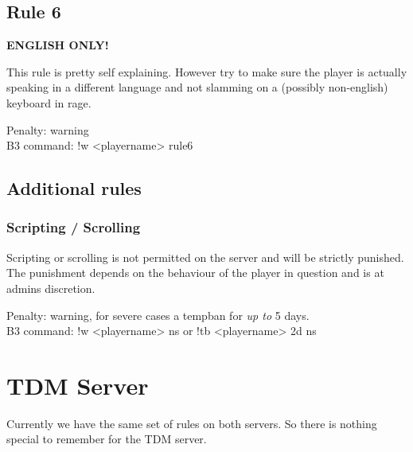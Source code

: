 \subsection*{Rule 6}
\label{rules:sd:6}
\textbf{ENGLISH ONLY!}

This rule is pretty self explaining. However try to make sure the player is actually speaking in a different language and not slamming on a (possibly non-english) keyboard in rage.

\begin{addmargin}[2em]{4em}
Penalty: warning \\
B3 command: !w <playername> rule6
\end{addmargin}

\subsection*{Additional rules}
\subsubsection{Scripting / Scrolling}
Scripting or scrolling is not permitted on the server and will be strictly punished. The punishment depends on the behaviour of the player in question and is at admins discretion.

\begin{addmargin}[2em]{4em}
Penalty: warning, for severe cases a tempban for \textit{up to} 5 days.\\
B3 command: !w <playername> ns or !tb <playername> 2d ns
\end{addmargin}


\section{TDM Server}
Currently we have the same set of rules on both servers. So there is nothing special to remember for the TDM server.
